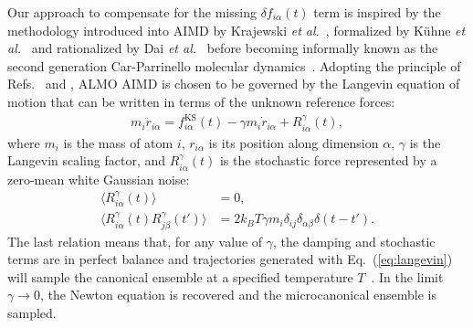 \documentclass[aps,prl,reprint,amsmath,amssymb]{revtex4-1}
\begin{document}
Our approach to compensate for the missing $\delta f_{i\alpha}(t)$ term is inspired by the methodology introduced into AIMD by Krajewski \emph{et al.}~\cite{Krajewski}, formalized by K\"uhne \emph{et al.}~\cite{a:2ndcpmd} and rationalized by Dai \emph{et al.}~\cite{a:langevin-why} before becoming informally known as the second generation Car-Parrinello molecular dynamics~\cite{Kuhne2013}. 
Adopting the principle of Refs.~ and , ALMO AIMD is chosen to be governed by the Langevin equation of motion that can be written in terms of the unknown reference forces:
%
\begin{align}
\label{eq:langevin}
m_i \ddot{r}_{i\alpha} = f^{\text{KS}}_{i\alpha}(t) - \gamma m_i \dot{r}_{i\alpha} + R^{\gamma}_{i\alpha} (t),
\end{align}
%
where $m_i$ is the mass of atom $i$, $r_{i\alpha}$ is its position along dimension $\alpha$, $\gamma$ is the Langevin scaling factor, and $R^{\gamma}_{i\alpha} (t)$ is the stochastic force represented by a zero-mean white Gaussian noise: %
%
\begin{align}
\label{eq:stochastic}
\langle R^{\gamma}_{i\alpha} (t) \rangle &= 0, \\
\langle R^{\gamma}_{i\alpha} (t)  R^{\gamma}_{j\beta} (t') \rangle &= 2 k_B T \gamma m_i \delta_{ij} \delta_{\alpha\beta} \delta(t-t').
\end{align}
% 
The last relation means that, for any value of $\gamma$, the damping and stochastic terms are in perfect balance and trajectories generated with Eq.~(\ref{eq:langevin}) will sample the canonical ensemble at a specified temperature $T$~\cite{a:Kubo-1986}. 
In the limit $\gamma \rightarrow 0$, the Newton equation is recovered and the microcanonical ensemble is sampled. 
\end{document}
